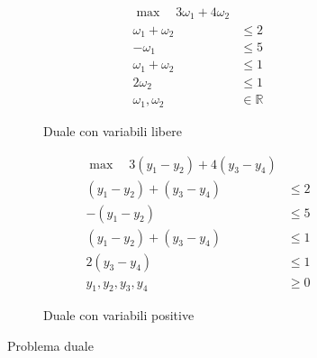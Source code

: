 \documentclass[\main/main.tex]{subfiles}
\begin{document}
\begin{figure}
  \begin{subfigure}{0.49\textwidth}
    \begin{align*}
      \max \quad 3\omega_1 + 4\omega_2     \\
      \omega_1 + \omega_2 & \leq 2         \\
      -\omega_1           & \leq 5         \\
      \omega_1 + \omega_2 & \leq 1         \\
      2\omega_2           & \leq 1         \\
      \omega_1, \omega_2  & \in \mathbb{R}
    \end{align*}
    \caption{Duale con variabili libere}
  \end{subfigure}
  \begin{subfigure}{0.49\textwidth}
    \begin{align*}
      \max \quad 3(y_1 - y_2) + 4(y_3 - y_4) \\
      (y_1 - y_2) + (y_3 - y_4) & \leq 2     \\
      -(y_1 - y_2)              & \leq 5     \\
      (y_1 - y_2) + (y_3 - y_4) & \leq 1     \\
      2(y_3 - y_4)              & \leq 1     \\
      y_1, y_2, y_3, y_4        & \geq 0
    \end{align*}
    \caption{Duale con variabili positive}
  \end{subfigure}
  \caption{Problema duale}
\end{figure}
\end{document}
